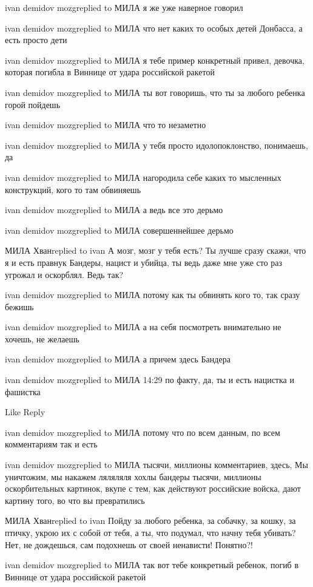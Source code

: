 ivan demidov mozgreplied to МИЛА
я же уже наверное говорил

ivan demidov mozgreplied to МИЛА
что нет каких то особых детей Донбасса, а есть просто дети

ivan demidov mozgreplied to МИЛА
я тебе пример конкретный привел, девочка, которая погибла в Виннице от удара российской ракетой

ivan demidov mozgreplied to МИЛА
ты вот говоришь, что ты за любого ребенка горой пойдешь

ivan demidov mozgreplied to МИЛА
что то незаметно

ivan demidov mozgreplied to МИЛА
у тебя просто идолопоклонство, понимаешь, да

ivan demidov mozgreplied to МИЛА
нагородила себе каких то мысленных конструкций, кого то там обвиняешь

ivan demidov mozgreplied to МИЛА
а ведь все это дерьмо

ivan demidov mozgreplied to МИЛА
совершеннейшее дерьмо

МИЛА Хванreplied to ivan
А мозг, мозг у тебя есть? Ты лучше сразу скажи, что я и есть правнук Бандеры, нацист и убийца, ты ведь даже мне уже сто раз угрожал и оскорблял. Ведь так?

ivan demidov mozgreplied to МИЛА
потому как ты обвинять кого то, так сразу бежишь

ivan demidov mozgreplied to МИЛА
а на себя посмотреть внимательно не хочешь, не желаешь

ivan demidov mozgreplied to МИЛА
а причем здесь Бандера

ivan demidov mozgreplied to МИЛА
14:29
по факту, да, ты и есть нацистка и фашистка

    Like
    Reply

ivan demidov mozgreplied to МИЛА
потому что по всем данным, по всем комментариям так и есть

ivan demidov mozgreplied to МИЛА
тысячи, миллионы комментариев, здесь, Мы уничтожим, мы накажем ляляляля хохлы бандеры тысячи, миллионы оскорбительных картинок, вкупе с тем, как действуют российские войска, дают картину того, во что вы превратились

МИЛА Хванreplied to ivan
Пойду за любого ребенка, за собачку, за кошку, за птичку, укрою их с собой от тебя, а ты, что подумал, что начну тебя убивать? Нет, не дождешься, сам подохнешь от своей ненависти! Понятно?!

ivan demidov mozgreplied to МИЛА
так вот тебе конкретный ребенок, погиб в Виннице от удара российской ракетой

